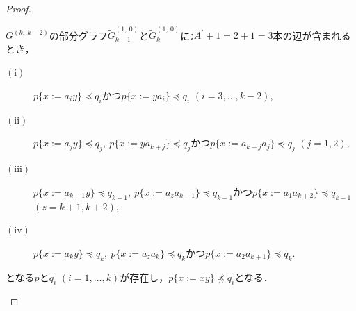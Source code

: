 \begin{proof}
\begin{enumerate}
\begin{enumerate}
\begin{ex}\label{少なくなるとき}
${G}^{(k,~k-2)}$の部分グラフ$\tilde{G}^{(1,~0)}_{k-1}$と$\tilde{G}^{(1,~0)}_{k}$に$\sharp A^{\prime}+1=2+1=3$本の辺が含まれるとき，
\begin{description}
\item[$(\mathrm{i})$] $p \{ x:= a_{i}y \} \preceq q_{i}$かつ$p \{ x:= ya_{i} \} \preceq q_{i}$ $(i=3, \ldots , k-2)$,
\item[$(\mathrm{ii})$] $p \{ x:=a_{j}y \} \preceq q_{j},~p \{ x:=ya_{k+j} \} \preceq q_{j}$かつ$p \{ x:=a_{k+j}a_{j} \} \preceq q_{j}$ $(j=1,2)$,
\item[$(\mathrm{iii})$] $p \{ x:=a_{k-1}y \} \preceq q_{k-1},~p \{ x:=a_{z}a_{k-1} \} \preceq q_{k-1}$かつ$p \{ x:=a_{1}a_{k+2} \} \preceq q_{k-1}$ \\$(z=k+1,k+2)$,
\item[$(\mathrm{iv})$] $p \{ x:=a_{k}y \} \preceq q_{k},~p \{ x:=a_{z}a_{k} \} \preceq q_{k}$かつ$p \{ x:=a_{2}a_{k+1} \} \preceq q_{k}$.
\end{description}
となる$p$と$q_{i}$ $(i=1,\ldots,k)$が存在し，$p \{ x:=xy \} \not \preceq q_{i}$となる．
\end{ex}


\end{enumerate}
\end{enumerate}
\end{proof}
